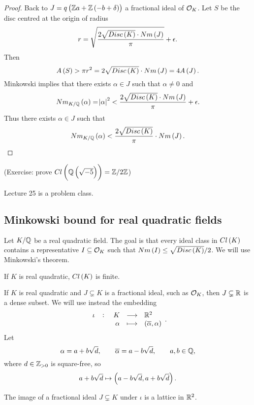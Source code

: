 \begin{proof}
Back to $ J = q\br{\Z a + \Z\br{-b + \delta}} $ a fractional ideal of $ \mathcal{O}_K $. Let $ S $ be the disc centred at the origin of radius
$$ r = \sqrt{\dfrac{2\sqrt{Disc\br{K}} \cdot Nm\br{J}}{\pi}} + \epsilon. $$
Then
$$ A\br{S} > \pi r^2 = 2\sqrt{Disc\br{K}} \cdot Nm\br{J} = 4A\br{J}. $$
Minkowski implies that there exists $ \alpha \in J $ such that $ \alpha \ne 0 $ and
$$ Nm_{K / \Q}\br{\alpha} = \abs{\alpha}^2 < \dfrac{2\sqrt{Disc\br{K}} \cdot Nm\br{J}}{\pi} + \epsilon. $$
Thus there exists $ \alpha \in J $ such that
$$ Nm_{K / \Q}\br{\alpha} < \dfrac{2\sqrt{Disc\br{K}}}{\pi} \cdot Nm\br{J}. $$
\end{proof}

(Exercise: prove $ Cl\br{\Q\br{\sqrt{-5}}} = \Z / 2\Z $)


Lecture 25 is a problem class.

\subsection{Minkowski bound for real quadratic fields}


Let $ K / \mathbb{Q} $ be a real quadratic field. The goal is that every ideal class in $ Cl\br{K} $ contains a representative $ I \subseteq \mathcal{O}_K $ such that $ Nm\br{I} \le \sqrt{Disc\br{K}} / 2 $. We will use Minkowski's theorem.

\begin{corollary}
If $ K $ is real quadratic, $ Cl\br{K} $ is finite.
\end{corollary}

If $ K $ is real quadratic and $ J \subsetneq K $ is a fractional ideal, such as $ \mathcal{O}_K $, then $ J \subsetneq \mathbb{R} $ is a dense subset. We will use instead the embedding
$$ \function[\iota]{K}{\R^2}{\alpha}{\br{\overline{\alpha}, \alpha}}. $$
Let
$$ \alpha = a + b\sqrt{d}, \qquad \overline{\alpha} = a - b\sqrt{d}, \qquad a, b \in \mathbb{Q}, $$
where $ d \in \mathbb{Z}_{> 0} $ is square-free, so
$$ a + b\sqrt{d} \mapsto \br{a - b\sqrt{d}, a + b\sqrt{d}}. $$

\begin{lemma}
The image of a fractional ideal $ J \subsetneq K $ under $ \iota $ is a lattice in $ \mathbb{R}^2 $.
\end{lemma}

